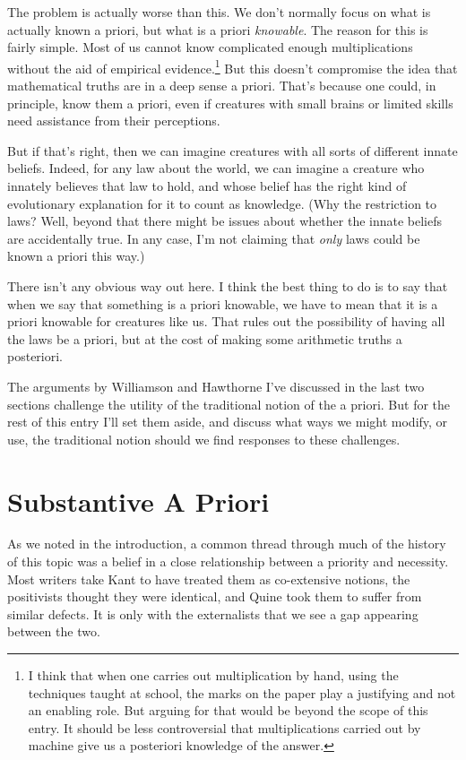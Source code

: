 The problem is actually worse than this. We don't normally focus on what is actually known a priori, but what is a priori \emph{knowable}. The reason for this is fairly simple. Most of us cannot know complicated enough multiplications without the aid of empirical evidence.\footnote{I think that when one carries out multiplication by hand, using the techniques taught at school, the marks on the paper play a justifying and not an enabling role. But arguing for that would be beyond the scope of this entry. It should be less controversial that multiplications carried out by machine give us a posteriori knowledge of the answer.} But this doesn't compromise the idea that mathematical truths are in a deep sense a priori. That's because one could, in principle, know them a priori, even if creatures with small brains or limited skills need assistance from their perceptions.

But if that's right, then we can imagine creatures with all sorts of different innate beliefs. Indeed, for any law about the world, we can imagine a creature who innately believes that law to hold, and whose belief has the right kind of evolutionary explanation for it to count as knowledge. (Why the restriction to laws? Well, beyond that there might be issues about whether the innate beliefs are accidentally true. In any case, I'm not claiming that \emph{only} laws could be known a priori this way.)

There isn't any obvious way out here. I think the best thing to do is to say that when we say that something is a priori knowable, we have to mean that it is a priori knowable for creatures like us. That rules out the possibility of having all the laws be a priori, but at the cost of making some arithmetic truths a posteriori.

The arguments by Williamson and Hawthorne I've discussed in the last two sections challenge the utility of the traditional notion of the a priori. But for the rest of this entry I'll set them aside, and discuss what ways we might modify, or use, the traditional notion should we find responses to these challenges.

\section{Substantive A Priori}
\label{substantiveapriori}

As we noted in the introduction, a common thread through much of the history of this topic was a belief in a close relationship between a priority and necessity. Most writers take Kant to have treated them as co-extensive notions, the positivists thought they were identical, and Quine took them to suffer from similar defects. It is only with the externalists that we see a gap appearing between the two.

